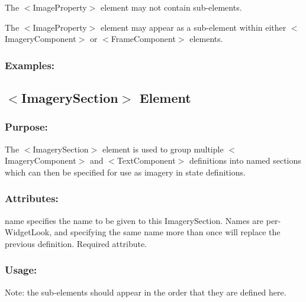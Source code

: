 \begin{DoxyItemize}
\item The {\ttfamily $<$Image\+Property$>$} element may not contain sub-\/elements. 
\item The {\ttfamily $<$Image\+Property$>$} element may appear as a sub-\/element within either {\ttfamily $<$Imagery\+Component$>$} or {\ttfamily $<$Frame\+Component$>$} elements. 
\end{DoxyItemize}\hypertarget{fal_element_ref_fal_elem_ref_sec_21_4}{}\subsubsection{Examples\+:}\label{fal_element_ref_fal_elem_ref_sec_21_4}
\hypertarget{fal_element_ref_fal_elem_ref_sec_22}{}\subsection{$<$\+Imagery\+Section$>$ Element}\label{fal_element_ref_fal_elem_ref_sec_22}
\hypertarget{fal_element_ref_fal_elem_ref_sec_22_1}{}\subsubsection{Purpose\+:}\label{fal_element_ref_fal_elem_ref_sec_22_1}
The {\ttfamily $<$Imagery\+Section$>$} element is used to group multiple {\ttfamily $<$Imagery\+Component$>$} and {\ttfamily $<$Text\+Component$>$} definitions into named sections which can then be specified for use as imagery in state definitions.\hypertarget{fal_element_ref_fal_elem_ref_sec_22_2}{}\subsubsection{Attributes\+:}\label{fal_element_ref_fal_elem_ref_sec_22_2}
\begin{DoxyItemize}
\item {\ttfamily name} specifies the name to be given to this Imagery\+Section. Names are per-\/\+Widget\+Look, and specifying the same name more than once will replace the previous definition. Required attribute.\end{DoxyItemize}
\hypertarget{fal_element_ref_fal_elem_ref_sec_22_3}{}\subsubsection{Usage\+:}\label{fal_element_ref_fal_elem_ref_sec_22_3}
Note\+: the sub-\/elements should appear in the order that they are defined here.


